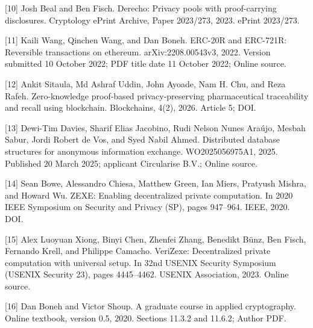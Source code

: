     [10] Josh Beal and Ben Fisch. Derecho: Privacy pools with
proof-carrying disclosures. Cryptology ePrint
Archive, Paper 2023/273, 2023. ePrint 2023/273.

    [11] Kaili Wang, Qinchen Wang, and Dan Boneh.
ERC-20R and ERC-721R: Reversible transactions on
ethereum. arXiv:2208.00543v3, 2022. Version
submitted 10 October 2022; PDF title date 11 October
2022; Online source.

    [12] Ankit Sitaula, Md Ashraf Uddin, John Ayoade,
Nam H. Chu, and Reza Rafeh. Zero-knowledge
proof-based privacy-preserving pharmaceutical
traceability and recall using blockchain. Blockchains,
4(2), 2026. Article 5; DOI.

    [13] Dewi-Tim Davies, Sharif Elias Jacobino, Rudi
Nelson Nunes Araújo, Mesbah Sabur, Jordi Robert
de Vos, and Syed Nabil Ahmed. Distributed database
structures for anonymous information exchange.
WO2025056975A1, 2025. Published 20 March 2025;
applicant Circularise B.V.; Online source.

    [14] Sean Bowe, Alessandro Chiesa, Matthew Green, Ian
Miers, Pratyush Mishra, and Howard Wu. ZEXE:
Enabling decentralized private computation. In 2020
IEEE Symposium on Security and Privacy (SP), pages
947--964. IEEE, 2020. DOI.


    [15] Alex Luoyuan Xiong, Binyi Chen, Zhenfei Zhang,
Benedikt Bünz, Ben Fisch, Fernando Krell, and
Philippe Camacho. VeriZexe: Decentralized private
computation with universal setup. In 32nd USENIX
Security Symposium (USENIX Security 23), pages
4445--4462. USENIX Association, 2023. Online
source.

    [16] Dan Boneh and Victor Shoup. A graduate course in
applied cryptography. Online textbook, version 0.5,
2020. Sections 11.3.2 and 11.6.2; Author PDF.
